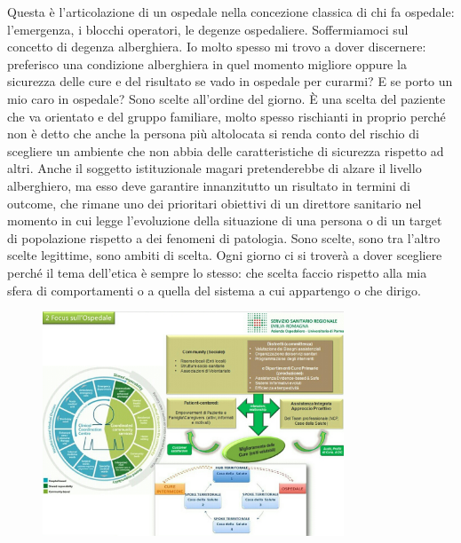 Questa è l'articolazione di un ospedale nella concezione classica di chi
fa ospedale: l'emergenza, i blocchi operatori, le degenze ospedaliere.
Soffermiamoci sul concetto di degenza alberghiera. Io molto spesso mi
trovo a dover discernere: preferisco una condizione alberghiera in quel
momento migliore oppure la sicurezza delle cure e del risultato se vado
in ospedale per curarmi? E se porto un mio caro in ospedale? Sono scelte
all'ordine del giorno. È una scelta del paziente che va orientato e del
gruppo familiare, molto spesso rischianti in proprio perché non è detto
che anche la persona più altolocata si renda conto del rischio di
scegliere un ambiente che non abbia delle caratteristiche di sicurezza
rispetto ad altri. Anche il soggetto istituzionale magari pretenderebbe
di alzare il livello alberghiero, ma esso deve garantire innanzitutto un
risultato in termini di outcome, che rimane uno dei prioritari obiettivi
di un direttore sanitario nel momento in cui legge l'evoluzione della
situazione di una persona o di un target di popolazione rispetto a dei
fenomeni di patologia. Sono scelte, sono tra l'altro scelte legittime,
sono ambiti di scelta. Ogni giorno ci si troverà a dover scegliere
perché il tema dell'etica è sempre lo stesso: che scelta faccio rispetto
alla mia sfera di comportamenti o a quella del sistema a cui appartengo
o che dirigo.

 \begin{figure}[!ht]
\centering
	\includegraphics[width=0.8\textwidth]{32/image11.jpeg}
	\end{figure}

